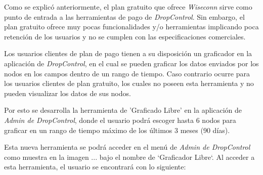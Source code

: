 Como se explicó anteriormente, el plan gratuito que ofrece \textit{Wiseconn} sirve como punto de entrada a las herramientas
de pago de \textit{DropControl}. Sin embargo, el plan gratuito ofrece muy pocas funcionalidades y/o herramientas
implicando poca retención de los usuarios y no se cumplen con las especificaciones comerciales.

Los usuarios clientes de plan de pago tienen a su disposición un graficador en la aplicación de \textit{DropControl}, en el cual
se pueden graficar los datos enviados por los nodos en los campos dentro de un rango de tiempo.
Caso contrario ocurre para los usuarios clientes de plan gratuito, los cuales no poseen esta herramienta y
no pueden visualizar los datos de sus nodos.

Por esto se desarrolla la herramienta de 'Graficado Libre' en la aplicación de \textit{Admin de DropControl},
donde el usuario podrá escoger hasta 6 nodos para graficar en un rango de tiempo máximo de los últimos 3 meses (90 días).

Esta nueva herramienta se podrá acceder en el menú de \textit{Admin de DropControl} como muestra en la imagen ... bajo el nombre de `Graficador Libre`. Al acceder a esta herramienta, el usuario se encontrará con lo siguiente:


